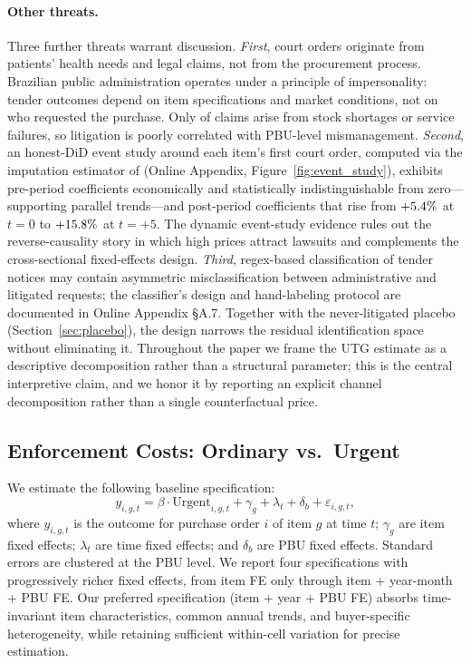 \paragraph{Other threats.} Three further threats warrant discussion. \emph{First}, court orders originate from patients' health needs and legal claims, not from the procurement process. Brazilian public administration operates under a principle of impersonality: tender outcomes depend on item specifications and market conditions, not on who requested the purchase. Only \BPstockShortageShare{} of claims arise from stock shortages or service failures, so litigation is poorly correlated with PBU-level mismanagement. \emph{Second}, an honest-DiD event study around each item's first court order, computed via the imputation estimator of \citet{borusyak2024revisiting} (Online Appendix, Figure~\ref{fig:event_study}), exhibits pre-period coefficients economically and statistically indistinguishable from zero---supporting parallel trends---and post-period coefficients that rise from $+5.4\%$ at $t=0$ to $+15.8\%$ at $t=+5$. The dynamic event-study evidence rules out the reverse-causality story in which high prices attract lawsuits and complements the cross-sectional fixed-effects design. \emph{Third}, regex-based classification of tender notices may contain asymmetric misclassification between administrative and litigated requests; the classifier's design and hand-labeling protocol are documented in Online Appendix \S A.7. Together with the never-litigated placebo (Section~\ref{sec:placebo}), the design narrows the residual identification space without eliminating it. Throughout the paper we frame the UTG estimate as a descriptive decomposition rather than a structural parameter; this is the central interpretive claim, and we honor it by reporting an explicit channel decomposition rather than a single counterfactual price.

\subsection{Enforcement Costs: Ordinary vs.\ Urgent}

We estimate the following baseline specification:
\begin{equation}
\label{eq:baseline}
y_{i,g,t} = \beta \cdot \text{Urgent}_{i,g,t} + \gamma_g + \lambda_t + \delta_b + \varepsilon_{i,g,t},
\end{equation}
where $y_{i,g,t}$ is the outcome for purchase order $i$ of item $g$ at time $t$; $\gamma_g$ are item fixed effects; $\lambda_t$ are time fixed effects; and $\delta_b$ are PBU fixed effects. Standard errors are clustered at the PBU level. We report four specifications with progressively richer fixed effects, from item FE only through item + year-month + PBU FE. Our preferred specification (item + year + PBU FE) absorbs time-invariant item characteristics, common annual trends, and buyer-specific heterogeneity, while retaining sufficient within-cell variation for precise estimation.

